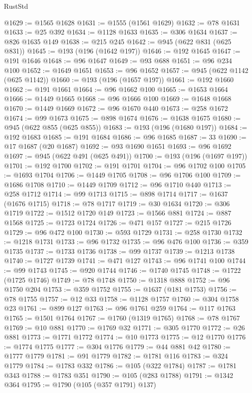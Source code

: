 \begin{lexlean}{RustStd}
\begin{coremodule}
@1629 := @1565 @1628
@1631 := @1555 (@1561 @1629)
@1632 := @78 @1631
@1633 := @25 @392
@1634 := @1128 @1633
@1635 := @306 @1634
@1637 := @826 @1635 @149
@1638 := @215 @245
@1642 := @945 (@622 @831 (@625 @831))
@1645 := @193 (@196 (@1642 @197))
@1646 := @192 @1645
@1647 := @191 @1646
@1648 := @96 @1647
@1649 := @93 @688
@1651 := @96 @234 @100
@1652 := @1649 @1651
@1653 := @96 @1652
@1657 := @945 (@622 @1142 (@625 @1142))
@1660 := @193 (@196 (@1657 @197))
@1661 := @192 @1660
@1662 := @191 @1661
@1664 := @96 @1662 @100
@1665 := @1653 @1664
@1666 := @1449 @1665
@1668 := @96 @1666 @100
@1669 := @1648 @1668
@1670 := @1449 @1669
@1672 := @96 @1670 @440
@1673 := @258 @1672
@1674 := @99 @1673
@1675 := @898 @1674
@1676 := @1638 @1675
@1680 := @945 (@622 @855 (@625 @855))
@1683 := @193 (@196 (@1680 @197))
@1684 := @192 @1683
@1685 := @191 @1684
@1686 := @96 @1685
@1687 := 33
@1690 := @17 @1687 (@20 @1687)
@1692 := @93 @1690 @1651
@1693 := @96 @1692
@1697 := @945 (@622 @491 (@625 @491))
@1700 := @193 (@196 (@1697 @197))
@1701 := @192 @1700
@1702 := @191 @1701
@1704 := @96 @1702 @100
@1705 := @1693 @1704
@1706 := @1449 @1705
@1708 := @96 @1706 @100
@1709 := @1686 @1708
@1710 := @1449 @1709
@1712 := @96 @1710 @440
@1713 := @258 @1712
@1714 := @99 @1713
@1715 := @898 @1714
@1717 := @1637 (@1676 @1715)
@1718 := @78 @1717
@1719 := @30 @1634
@1720 := @306 @1719
@1722 := @1512 @1720 @149
@1723 := @1566 @881
@1724 := @887 @1568
@1725 := @1723 @1724
@1726 := @471 @157
@1727 := @215 @1726
@1729 := @96 @472 @100
@1730 := @593 @1729
@1731 := @258 @1730
@1732 := @1218 @1731
@1733 := @96 @1732
@1735 := @96 @476 @100
@1736 := @359 @1735
@1737 := @1733 @1736
@1738 := @99 @1737
@1739 := @1213 @1738
@1740 := @1727 @1739
@1741 := @471 @127
@1743 := @96 @1741 @100
@1744 := @99 @1743
@1745 := @920 @1744
@1746 := @1740 @1745
@1748 := @1722 (@1725 @1746)
@1749 := @78 @1748
@1750 := @1318 @888
@1752 := @96 @1750 @204
@1753 := @359 @1752
@1755 := @1637 (@181 @1753)
@1756 := @78 @1755
@1757 := @12 @33
@1758 := @1128 @1757
@1760 := @304 @1758 @23
@1761 := @899 @127
@1763 := @96 @1761 @259
@1764 := @117 @1763
@1765 := @1501 @1764
@1767 := @1760 (@1319 @1765)
@1768 := @78 @1767
@1769 := @10 @881
@1770 := @1769 @32
@1771 := @305 @1770
@1772 := @26 @881
@1773 := @1771 @1772
@1774 := @10 @1773
@1775 := @12 @1770
@1776 := @1774 @1775
@1777 := @304 @1776
@1779 := @44 @881 @42
@1780 := @1777 @1779
@1781 := @91 @1779
@1782 := @1781 @116
@1783 := @324 @1779
@1784 := @1783 @332
@1786 := @105 (@322 @1784)
@1787 := @1781 @343
@1788 := @1783 @351
@1790 := @105 (@283 @1788)
@1791 := @1342 @364
@1795 := @1790 (@105 (@357 @1791) @137)

\end{coremodule}
\end{lexlean}
